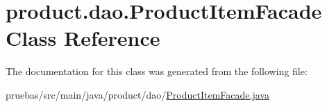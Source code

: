 \hypertarget{classproduct_1_1dao_1_1_product_item_facade}{}\section{product.\+dao.\+Product\+Item\+Facade Class Reference}
\label{classproduct_1_1dao_1_1_product_item_facade}


The documentation for this class was generated from the following file\+:\begin{DoxyCompactItemize}
\item 
pruebas/src/main/java/product/dao/\mbox{\hyperlink{_product_item_facade_8java}{Product\+Item\+Facade.\+java}}\end{DoxyCompactItemize}
